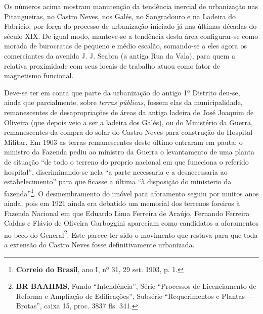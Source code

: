 Os números acima mostram manutenção da tendência inercial de urbanização nas Pitangueiras, no Castro Neves, nos Galés, no Sangradouro e na Ladeira do Fabrício, por força do processo de urbanização iniciado já nas últimas décadas do século XIX. De igual modo, manteve-se a tendência desta área configurar-se como morada de burocratas de pequeno e médio escalão, somando-se a eles agora os comerciantes da avenida J. J. Seabra (a antiga Rua da Vala), para quem a relativa proximidade com seus locais de trabalho atuou como fator de magnetismo funcional.


Deve-se ter em conta que parte da urbanização do antigo 1º Distrito deu-se, ainda que parcialmente, sobre \textit{terras públicas}, fossem elas da municipalidade, remanescentes de desapropriações de áreas da antiga ladeira de José Joaquim de Oliveira (que depois veio a ser a ladeira dos Galés), ou do Ministério da Guerra, remanescentes da compra do solar do Castro Neves para construção do Hospital Militar. Em 1903 as terras remanescentes deste último entraram em pauta: o ministro da Fazenda pediu ao ministro da Guerra o levantamento de uma planta de situação ``de todo o terreno do proprio nacional em que funcciona o referido hospital'', discriminando-se nela ``a parte necessaria e a desnecessaria ao estabelecimento'' para que ficasse a última ``à disposição do ministerio da fazenda''\footnote{\textbf{Correio do Brasil}, ano I, nº 31, 29 set. 1903, p. 1.}. O desmembramento do imóvel para aforamento seguiu por muitos anos ainda, pois em 1921 ainda era debatido um memorial dos terrenos foreiros à Fazenda Nacional em que Eduardo Lima Ferreira de Araújo, Fernando Ferreira Caldas e Flávio de Oliveira Garboggini apareciam como candidatos a aforamentos no beco do General\footnote{\textbf{BR BAAHMS}, Fundo ``Intendência'', Série ``Processos de Licenciamento de Reforma e Ampliação de Edificações'', Subsérie ``Requerimentos e Plantas --- Brotas'', caixa 15, proc. 3837 fls. 341.}. Este parece ter sido o movimento que restava para que toda a extensão do Castro Neves fosse definitivamente urbanizada.

